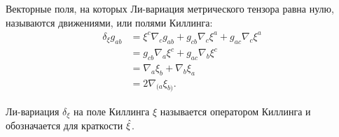 \documentclass[12pt,a4paper]{article}
\begin{document}
        Векторные поля, на которых Ли-вариация метрического тензора равна нулю, называются движениями, или полями Киллинга:
        \begin{equation}\begin{aligned}
            \delta_\xi g_{ab}
                &= \xi^c \nabla_c g_{ab} + g_{cb} \nabla_{c} \xi^a + g_{ac} \nabla_{c} \xi^a \\
                &= g_{cb} \nabla_{a} \xi^c + g_{ac} \nabla_{b} \xi^c \\
                &= \nabla_{a} \xi_b + \nabla_{b} \xi_a \\
                &= 2 \nabla_{(a} \xi_{b)}.
        \end{aligned}\end{equation}

        Ли-вариация $\delta_\xi$ на поле Киллинга $\xi$ называется оператором Киллинга и обозначается для краткости $\hat{\mathbf{\xi}}$.
\end{document}
